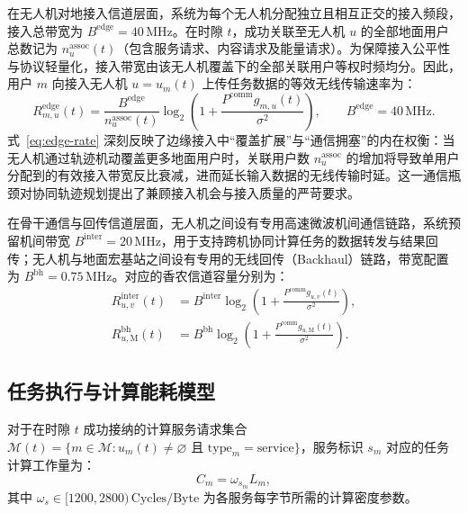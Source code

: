 在无人机对地接入信道层面，系统为每个无人机分配独立且相互正交的接入频段，接入总带宽为 $B^{\mathrm{edge}} = 40\,\mathrm{MHz}$。在时隙 $t$，成功关联至无人机 $u$ 的全部地面用户总数记为 $n_u^{\mathrm{assoc}}(t)$（包含服务请求、内容请求及能量请求）。为保障接入公平性与协议轻量化，接入带宽由该无人机覆盖下的全部关联用户等权时频均分。因此，用户 $m$ 向接入无人机 $u=u_m(t)$ 上传任务数据的等效无线传输速率为：
\begin{equation}
    R^{\mathrm{edge}}_{m,u}(t) = 
    \frac{B^{\mathrm{edge}}}{n_u^{\mathrm{assoc}}(t)}
    \log_2\left(1 + \frac{P^{\mathrm{comm}}g_{m,u}(t)}{\sigma^2}\right),
    \qquad B^{\mathrm{edge}}=40\,\mathrm{MHz}.
    \label{eq:edge-rate}
\end{equation}
式~\eqref{eq:edge-rate} 深刻反映了边缘接入中“覆盖扩展”与“通信拥塞”的内在权衡：当无人机通过轨迹机动覆盖更多地面用户时，关联用户数 $n_u^{\mathrm{assoc}}$ 的增加将导致单用户分配到的有效接入带宽反比衰减，进而延长输入数据的无线传输时延。这一通信瓶颈对协同轨迹规划提出了兼顾接入机会与接入质量的严苛要求。

在骨干通信与回传信道层面，无人机之间设有专用高速微波机间通信链路，系统预留机间带宽 $B^{\mathrm{inter}} = 20\,\mathrm{MHz}$，用于支持跨机协同计算任务的数据转发与结果回传；无人机与地面宏基站之间设有专用的无线回传（Backhaul）链路，带宽配置为 $B^{\mathrm{bh}} = 0.75\,\mathrm{MHz}$。对应的香农信道容量分别为：
\begin{equation}
    \begin{aligned}
    R^{\mathrm{inter}}_{u,v}(t) &= B^{\mathrm{inter}} \log_2\left(1 + \frac{P^{\mathrm{comm}}g_{u,v}(t)}{\sigma^2}\right),\\
    R^{\mathrm{bh}}_{u,\mathrm M}(t) &= B^{\mathrm{bh}} \log_2\left(1 + \frac{P^{\mathrm{comm}}g_{u,\mathrm M}(t)}{\sigma^2}\right).
    \end{aligned}
    \label{eq:ch3-other-rates}
\end{equation}

\subsection{任务执行与计算能耗模型}
\label{sec:ch3-service-paths}
\label{sec:ch3-energy-accounting}
\label{sec:ch3-cache-dynamics}
\label{sec:ch3-battery-motion}

对于在时隙 $t$ 成功接纳的计算服务请求集合 $\mathcal M(t) = \{m \in \mathcal M: u_m(t) \neq \varnothing \text{ 且 } \text{type}_m = \text{service}\}$，服务标识 $s_m$ 对应的任务计算工作量为：
\begin{equation}
    C_m = \omega_{s_m} L_m,
    \label{eq:ch3-cpu-cycles}
\end{equation}
其中 $\omega_s \in [1200, 2800)\,\text{Cycles/Byte}$ 为各服务每字节所需的计算密度参数。

